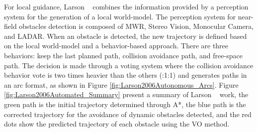     For local guidance, Larson \etal~\cite{Larson2006Autonomous} combines the information provided by a perception system for the generation of a local world-model. The perception system for near-field obstacles detection is composed of \ac{MWR}, Stereo Vision, Monocular Camera, and \ac{LADAR}. When an obstacle is detected, the new trajectory is defined based on the local world-model and a behavior-based approach. There are three behaviors: keep the last planned path, collision avoidance path, and free-space path. The decision is made through a voting system where the collision avoidance behavior vote is two times heavier than the others (:1:1) and generates paths in an arc format, as shown in Figure \ref{fig:Larson2006Autonomous_Arcs}. Figure \ref{fig:Larson2006Automated_Summary} present a summary of Larson \etal~ work, the green path is the initial trajectory determined through A*, the blue path is the corrected trajectory for the avoidance of dynamic obstacles detected, and the red dots show the predicted trajectory of each obstacle using the \ac{VO} method.
    
